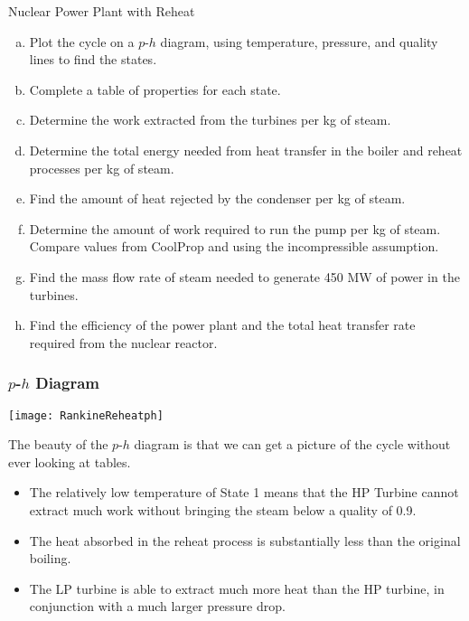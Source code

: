 \begin{example}[label=ex:ch4_supercrit]{Nuclear Power Plant with Reheat}
  \begin{enumerate}[a)]
  \item Plot the cycle on a $p$-$h$ diagram, using temperature, pressure, and quality lines to find the states.
  \item Complete a table of properties for each state.
  \item Determine the work extracted from the turbines per kg of steam.
  \item Determine the total energy needed from heat transfer in the boiler and reheat processes per kg of steam.
  \item Find the amount of heat rejected by the condenser per kg of steam.
  \item Determine the amount of work required to run the pump per kg of steam.  Compare values from CoolProp and using the incompressible assumption.
  \item Find the mass flow rate of steam needed to generate 450 MW of power in the turbines.
  \item Find the efficiency of the power plant and the total heat transfer rate required from the nuclear reactor.
  \end{enumerate}

  \subsubsection*{$p$-$h$ Diagram}
  
  \begin{center}
    \texttt{[image: RankineReheatph]}
  \end{center}

  The beauty of the $p$-$h$ diagram is that we can get a picture of the cycle without ever looking at tables.
  \begin{itemize}
  \item The relatively low temperature of State 1 means that the HP Turbine cannot extract much work without bringing the steam below a quality of 0.9.
  \item The heat absorbed in the reheat process is substantially less than the original boiling.
  \item The LP turbine is able to extract much more heat than the HP turbine, in conjunction with a much larger pressure drop.
  \end{itemize}


\end{example}
